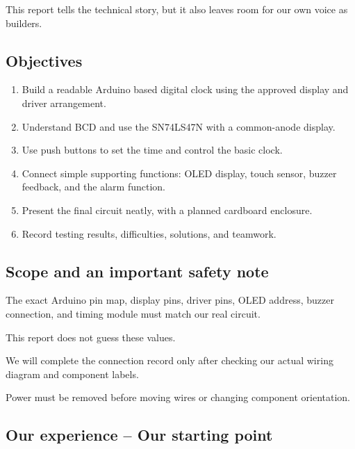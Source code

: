 \documentclass[12pt,letterpaper]{article}
\begin{document}
This report tells the technical story,
but it also leaves room for our own voice
as builders.

\subsection{Objectives}

\begin{enumerate}

  \item
  Build a readable Arduino based digital clock
  using the approved display and driver arrangement.

  \item
  Understand BCD and use the SN74LS47N
  with a common-anode display.

  \item
  Use push buttons to set the time
  and control the basic clock.

  \item
  Connect simple supporting functions:
  OLED display, touch sensor, buzzer feedback, and the alarm function.

  \item
  Present the final circuit neatly,
  with a planned cardboard enclosure.

  \item
  Record testing results,
  difficulties, solutions, and teamwork.

\end{enumerate}

\subsection{Scope and an important safety note}

The exact Arduino pin map,
display pins,
driver pins,
OLED address,
buzzer connection,
and timing module must match our real circuit.

This report does not guess these values.

We will complete the connection record only after
checking our actual wiring diagram
and component labels.

Power must be removed before moving wires
or changing component orientation.

\subsection*{Our experience -- Our starting point}
\end{document}
